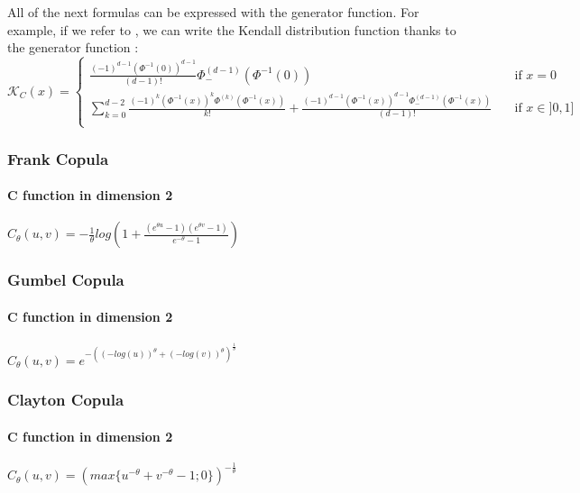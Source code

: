 \documentclass{article}
\begin{document}
	
	All of the next formulas can be expressed with the generator function.\newline
	For example, if we refer to \cite{archimedeancopulas}, we can write the Kendall distribution function thanks to the generator function :
	\[
   		\mathcal{K}_C (x) =
   		\begin{cases}
        \frac{(-1)^{d-1}(\Phi^{-1}(0))^{d-1}}{(d-1)!}\Phi_-^{(d-1)}(\Phi^{-1}(0))  & \quad \text{if } x=0 \\
    \sum\limits_{k=0}^{d-2}\frac{(-1)^{k}(\Phi^{-1}(x))^{k}\Phi^{(k)}(\Phi^{-1}(x))}{k!}+\frac{(-1)^{d-1}(\Phi^{-1}(x))^{d-1}\Phi_-^{(d-1)}(\Phi^{-1}(x))}{(d-1)!} & \quad \text{if } x \in ]0,1] \\
  \end{cases}
  \]
   	\subsubsection{Frank Copula}	
   	\paragraph{C function in dimension 2}
   	\begin{math}
   		C_{\theta}(u,v) = -\frac{1}{\theta}log(1+\frac{(e^{\theta u}-1)(e^{\theta v}-1)}{e^{-\theta}-1})
   	\end{math}

   	
   	\subsubsection{Gumbel Copula}
   	
   	\paragraph{C function in dimension 2}
   	\begin{math}
   		C_{\theta}(u,v) = e^{-((-log(u))^{\theta}+(-log(v))^{\theta})^{\frac{1}{\theta}}}
   	\end{math}
   	
   	
   	
   	\subsubsection{Clayton Copula}	
   	
	\paragraph{C function in dimension 2}
   	\begin{math}
   		C_{\theta}(u,v) = (max\{u^{-\theta}+v^{-\theta}-1;0\})^{-\frac{1}{\theta}}
   	\end{math}
	
\end{document}
